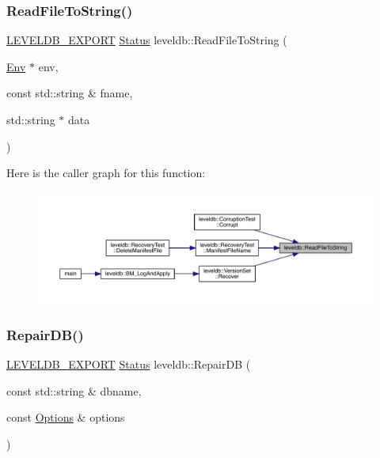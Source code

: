 \subsubsection{\texorpdfstring{ReadFileToString()}{ReadFileToString()}}
{\footnotesize\ttfamily \mbox{\hyperlink{export_8h_a658cd25b9dd114d894ae8ce9dddb7d3a}{L\+E\+V\+E\+L\+D\+B\+\_\+\+E\+X\+P\+O\+RT}} \mbox{\hyperlink{classleveldb_1_1_status}{Status}} leveldb\+::\+Read\+File\+To\+String (\begin{DoxyParamCaption}\item[{\mbox{\hyperlink{classleveldb_1_1_env}{Env}} $\ast$}]{env,  }\item[{const std\+::string \&}]{fname,  }\item[{std\+::string $\ast$}]{data }\end{DoxyParamCaption})}

Here is the caller graph for this function\+:
\nopagebreak
\begin{figure}[H]
\begin{center}
\leavevmode
\includegraphics[width=350pt]{namespaceleveldb_a2d2b5dcaccd555df746cc89ffcd9cd05_icgraph}
\end{center}
\end{figure}
\mbox{\label{namespaceleveldb_aa19b8fd0c5732d463fbf6af09792676a}} 
\subsubsection{\texorpdfstring{RepairDB()}{RepairDB()}}
{\footnotesize\ttfamily \mbox{\hyperlink{export_8h_a658cd25b9dd114d894ae8ce9dddb7d3a}{L\+E\+V\+E\+L\+D\+B\+\_\+\+E\+X\+P\+O\+RT}} \mbox{\hyperlink{classleveldb_1_1_status}{Status}} leveldb\+::\+Repair\+DB (\begin{DoxyParamCaption}\item[{const std\+::string \&}]{dbname,  }\item[{const \mbox{\hyperlink{structleveldb_1_1_options}{Options}} \&}]{options }\end{DoxyParamCaption})}

